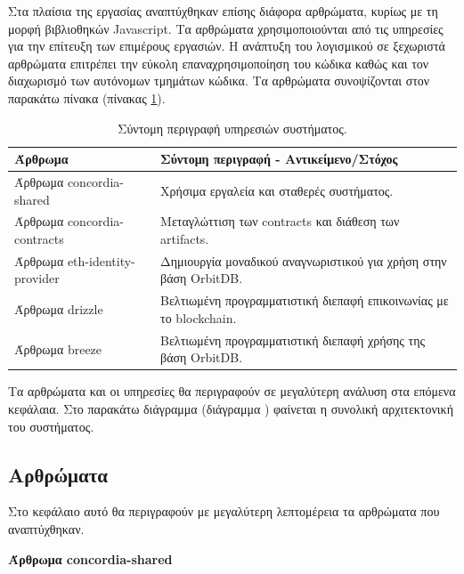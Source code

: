 Στα πλαίσια της εργασίας αναπτύχθηκαν επίσης διάφορα αρθρώματα, κυρίως με τη μορφή βιβλιοθηκών Javascript. Τα αρθρώματα χρησιμοποιούνται από τις υπηρεσίες για την επίτευξη των επιμέρους εργασιών. Η ανάπτυξη του λογισμικού σε ξεχωριστά αρθρώματα επιτρέπει την εύκολη επαναχρησιμοποίηση του κώδικα καθώς και τον διαχωρισμό των αυτόνομων τμημάτων κώδικα. Τα αρθρώματα συνοψίζονται στον παρακάτω πίνακα (πίνακας \ref{table:4-4-software-units-summary}).

\begin{table}[H]
\begin{center}
\begin{tabular}{|l l|}
 \hline
 \textbf{Άρθρωμα} & \textbf{Σύντομη περιγραφή - Αντικείμενο/Στόχος} \\
 \hline\hline
 Άρθρωμα concordia-shared & Χρήσιμα εργαλεία και σταθερές συστήματος. \\ [0.5ex]
 \hline
 Άρθρωμα concordia-contracts & Μεταγλώττιση των contracts και διάθεση των artifacts. \\ [0.5ex]
 \hline
 Άρθρωμα eth-identity-provider & Δημιουργία μοναδικού αναγνωριστικού για χρήση στην βάση OrbitDB. \\ [0.5ex]
 \hline
 Άρθρωμα drizzle & Βελτιωμένη προγραμματιστική διεπαφή επικοινωνίας με το blockchain. \\ [0.5ex]
 \hline
 Άρθρωμα breeze & Βελτιωμένη προγραμματιστική διεπαφή χρήσης της βάση OrbitDB. \\ [0.5ex]
 \hline
\end{tabular}
\end{center}
\caption{Σύντομη περιγραφή υπηρεσιών συστήματος.}
\label{table:4-4-software-units-summary}
\end{table}

Τα αρθρώματα και οι υπηρεσίες θα περιγραφούν σε μεγαλύτερη ανάλυση στα επόμενα κεφάλαια. Στο παρακάτω διάγραμμα (διάγραμμα ) φαίνεται η συνολική αρχιτεκτονική του συστήματος.


\subsection{Αρθρώματα} \label{subsection:4-4-software-units}

Στο κεφάλαιο αυτό θα περιγραφούν με μεγαλύτερη λεπτομέρεια τα αρθρώματα που αναπτύχθηκαν.

\vspace{0.5cm}
\textbf{Άρθρωμα concordia-shared}

